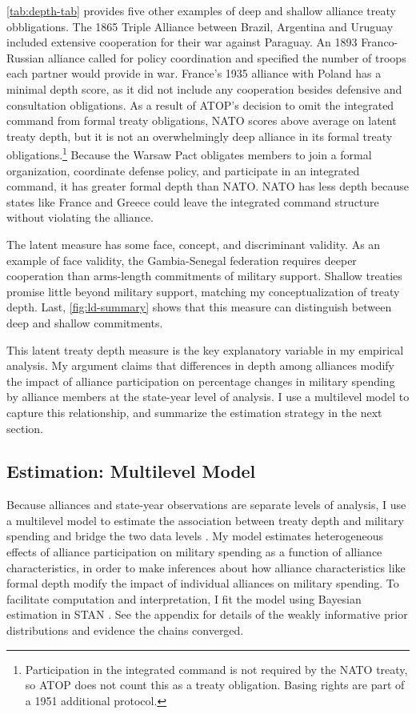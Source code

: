 \documentclass[12pt]{article}
\begin{document}
\autoref{tab:depth-tab} provides five other examples of deep and shallow alliance treaty obbligations.  
The 1865 Triple Alliance between Brazil, Argentina and Uruguay included extensive cooperation for their war against Paraguay. 
An 1893 Franco-Russian alliance called for policy coordination and specified the number of troops each partner would provide in war. 
France's 1935 alliance with Poland has a minimal depth score, as it did not include any cooperation besides defensive and consultation obligations. 
As a result of ATOP's decision to omit the integrated command from formal treaty obligations, NATO scores above average on latent treaty depth, but it is not an overwhelmingly deep alliance in its formal treaty obligations.\footnote{Participation in the integrated command is not required by the NATO treaty, so ATOP does not count this as a treaty obligation. Basing rights are part of a 1951 additional protocol.}
Because the Warsaw Pact obligates members to join a formal organization, coordinate defense policy, and participate in an integrated command, it has greater formal depth than NATO. 
NATO has less depth because states like France and Greece could leave the integrated command structure without violating the alliance. 


The latent measure has some face, concept, and discriminant validity. 
As an example of face validity, the Gambia-Senegal federation requires deeper cooperation than arms-length commitments of military support. 
Shallow treaties promise little beyond military support, matching my conceptualization of treaty depth. 
Last, \autoref{fig:ld-summary} shows that this measure can distinguish between deep and shallow commitments. 


This latent treaty depth measure is the key explanatory variable in my empirical analysis. 
My argument claims that differences in depth among alliances modify the impact of alliance participation on percentage changes in military spending by alliance members at the state-year level of analysis. 
I use a multilevel model to capture this relationship, and summarize the estimation strategy in the next section. 


\subsection{Estimation: Multilevel Model} 


Because alliances and state-year observations are separate levels of analysis, I use a multilevel model to estimate the association between treaty depth and military spending and bridge the two data levels \citep{SteenbergenJones2002, GelmanHill2007}. 
My model estimates heterogeneous effects of alliance participation on military spending as a function of alliance characteristics, in order to make inferences about how alliance characteristics like formal depth modify the impact of individual alliances on military spending. 
To facilitate computation and interpretation, I fit the model using Bayesian estimation in STAN \citep{Carpenteretal2016}. 
See the appendix for details of the weakly informative prior distributions and evidence the chains converged.
\end{document}

